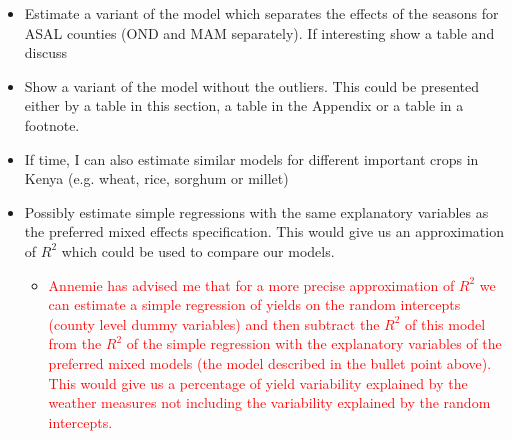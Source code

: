 \documentclass[a4paper,12pt]{article}
\begin{document}
\begin{itemize}
\item Estimate a variant of the model which separates the effects of the seasons for ASAL counties (OND and MAM separately). If interesting show a table and discuss

\item Show a variant of the model without the outliers. This could be presented either by a table in this section, a table in the Appendix or a table in a footnote. 

\item If time, I can also estimate similar models for different important crops in Kenya (e.g. wheat, rice, sorghum or millet)

\item Possibly estimate simple regressions with the same explanatory variables as the preferred mixed effects specification. This would give us an approximation of $R^2$ which could be used to compare our models.

		\begin{itemize}
			\item \textcolor{red}{Annemie has advised me that for a more precise approximation of $R^2$ we can estimate a simple regression of yields on the random intercepts (county level dummy variables) and then subtract the $R^2$ of this model from the $R^2$ of the simple regression with the explanatory variables of the preferred mixed models (the model described in the bullet point above). This would give us a percentage of yield variability explained by the weather measures not including the variability explained by the random intercepts.}
	\end{itemize}
		\end{itemize}

\color{black}
\end{document}
